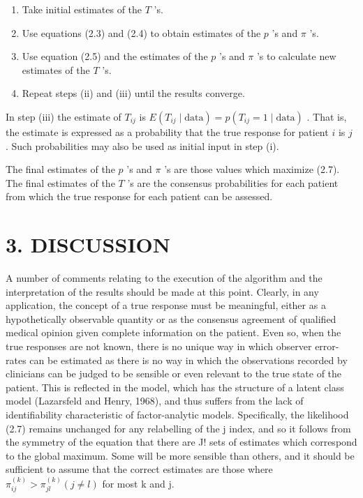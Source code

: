 \documentclass[
]{article}
\begin{document}
\begin{enumerate}
\def\labelenumi{(\roman{enumi})}
\item
  Take initial estimates of the \(T\) 's.
\item
  Use equations (2.3) and (2.4) to obtain estimates of the \(p\) 's and
  \(\pi\) 's.\\
\item
  Use equation (2.5) and the estimates of the \(p\) 's and \(\pi\) 's to
  calculate new estimates of the \(T\) 's.\\
\item
  Repeat steps (ii) and (iii) until the results converge.
\end{enumerate}

In step (iii) the estimate of \(T_{ij}\) is
\(E(T_{ij} \mid \text{data}) = p(T_{ij} = 1 \mid \text{data})\) . That
is, the estimate is expressed as a probability that the true response
for patient \(i\) is \(j\) . Such probabilities may also be used as
initial input in step (i).

The final estimates of the \(p\) 's and \(\pi\) 's are those values
which maximize (2.7). The final estimates of the \(T\) 's are the
consensus probabilities for each patient from which the true response
for each patient can be assessed.

\section{3. DISCUSSION}\label{discussion}

A number of comments relating to the execution of the algorithm and the
interpretation of the results should be made at this point. Clearly, in
any application, the concept of a true response must be meaningful,
either as a hypothetically observable quantity or as the consensus
agreement of qualified medical opinion given complete information on the
patient. Even so, when the true responses are not known, there is no
unique way in which observer error-rates can be estimated as there is no
way in which the observations recorded by clinicians can be judged to be
sensible or even relevant to the true state of the patient. This is
reflected in the model, which has the structure of a latent class model
(Lazarsfeld and Henry, 1968), and thus suffers from the lack of
identifiability characteristic of factor-analytic models. Specifically,
the likelihood (2.7) remains unchanged for any relabelling of the j
index, and so it follows from the symmetry of the equation that there
are J! sets of estimates which correspond to the global maximum. Some
will be more sensible than others, and it should be sufficient to assume
that the correct estimates are those where
\(\pi_{ij}^{(k)} > \pi_{jl}^{(k)} (j \neq l)\) for most k and j.
\end{document}
